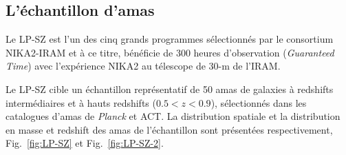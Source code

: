 \subsection{L'échantillon d'amas}
Le LP-SZ est l'un des cinq grands programmes sélectionnés par le
consortium NIKA2-IRAM et à ce titre, bénéficie de 300 heures
d'observation (\emph{Guaranteed Time}) avec l'expérience NIKA2 au
télescope de 30-m de l'IRAM.

Le LP-SZ cible un échantillon représentatif de 50 amas de galaxies à
redshifts intermédiaires et à hauts redshifts ($0.5 < z < 0.9$),
sélectionnés dans les catalogues d'amas de \emph{Planck} et ACT. La
distribution spatiale et la distribution en masse et redshift
des amas de l'échantillon sont présentées respectivement, Fig.~\ref{fig:LP-SZ} et Fig.~\ref{fig:LP-SZ-2}.
%
%

